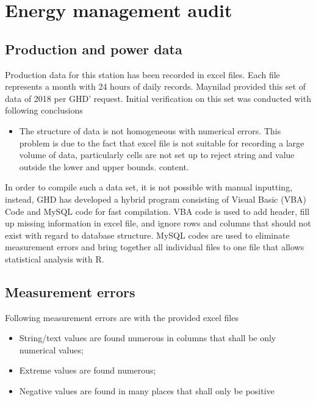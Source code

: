 
\section{Energy management audit}
\label{46}
\subsection{Production and power data}
Production data for this station has been recorded in excel files. Each file represents a month with 24 hours of daily records. Maynilad provided this set of data of 2018 per GHD' request. Initial verification on this set was conducted with following conclusions

\begin{itemize}
	
	\item The structure of data is not homogeneous with numerical errors. This problem is due to the fact that excel file is not suitable for recording a large volume of data, particularly cells are not set up to reject string and value outside the lower and upper bounds.
	content.
\end{itemize}


In order to compile such a data set, it is not possible with manual inputting, instead, GHD has developed a hybrid program consisting of Visual Basic (VBA) Code and MySQL code for fast compilation. VBA code is used to add header, fill up missing information in excel file, and ignore rows and columns that should not exist with regard to database structure. MySQL codes are used to eliminate measurement errors and bring together all individual files to one file that allows statistical analysis with R.
\subsection{Measurement errors}
Following measurement errors are with the provided excel files
\begin{itemize}
\item String/text values are found numerous in columns that shall be only numerical values;
\item Extreme values are found numerous;
\item Negative values are found in many places that shall only be positive
\end{itemize}
